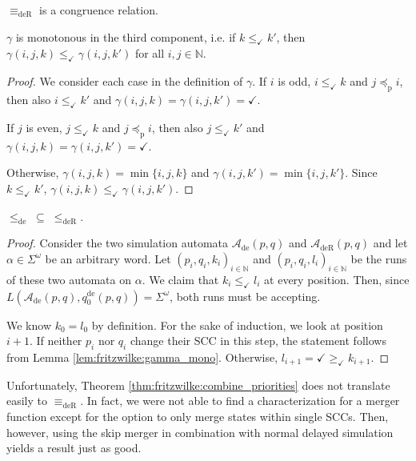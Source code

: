 \begin{theorem}
	$\equiv_\text{deR}$ is a congruence relation.
\end{theorem}

\begin{lem}
\label{lem:fritzwilke:gamma_mono}
	$\gamma$ is monotonous in the third component, i.e. if $k \leq_\checkmark k'$, then $\gamma(i, j, k) \leq_\checkmark \gamma(i, j, k')$ for all $i, j \in \mathbb{N}$.
\end{lem}

\begin{proof}
	We consider each case in the definition of $\gamma$. If $i$ is odd, $i \leq_\checkmark k$ and $j \preceq_\text{p} i$, then also $i \leq_\checkmark k'$ and $\gamma(i, j, k) = \gamma(i, j, k') = \checkmark$.
	
	If $j$ is even, $j \leq_\checkmark k$ and $j \preceq_\text{p} i$, then also $j \leq_\checkmark k'$ and $\gamma(i, j, k) = \gamma(i, j, k') = \checkmark$.
	
	Otherwise, $\gamma(i, j, k) = \min \{i, j, k\}$ and $\gamma(i, j, k') = \min \{i, j, k'\}$. Since $k \leq_\checkmark k'$, $\gamma(i, j, k) \leq_\checkmark \gamma(i, j, k')$.
\end{proof}

\begin{lem}
	$\leq_\text{de} \;\subseteq\; \leq_\text{deR}$.
\end{lem}

\begin{proof} 
	Consider the two simulation automata $\mathcal{A}_\text{de}(p, q)$ and $\mathcal{A}_\text{deR}(p, q)$ and let $\alpha \in \Sigma^\omega$ be an arbitrary word. Let $(p_i, q_i, k_i)_{i \in \mathbb{N}}$ and $(p_i, q_i, l_i)_{i \in \mathbb{N}}$ be the runs of these two automata on $\alpha$. We claim that $k_i \leq_\checkmark l_i$ at every position. Then, since $L(\mathcal{A}_\text{de}(p, q), q_0^\text{de}(p, q)) = \Sigma^\omega$, both runs must be accepting.
	
	We know $k_0 = l_0$ by definition. For the sake of induction, we look at position $i+1$. If neither $p_i$ nor $q_i$ change their SCC in this step, the statement follows from Lemma \ref{lem:fritzwilke:gamma_mono}. Otherwise, $l_{i+1} = \checkmark \geq_\checkmark k_{i+1}$.
\end{proof}

\vspace{5pt}

Unfortunately, Theorem \ref{thm:fritzwilke:combine_priorities} does not translate easily to $\equiv_\text{deR}$. In fact, we were not able to find a characterization for a merger function except for the option to only merge states within single SCCs. Then, however, using the skip merger in combination with normal delayed simulation yields a result just as good.




















